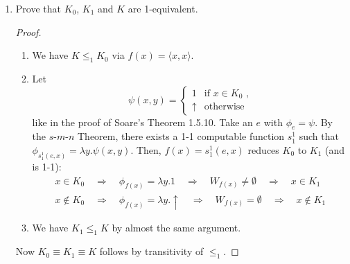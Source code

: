 \documentclass[a4paper,11pt]{article}
\begin{document}
\begin{enumerate}
\item %
Prove that $K_0$, $K_1$ and $K$ are 1-equivalent.

\begin{proof}
\begin{enumerate}
\item We have $K \leq_1 K_0$ via $f(x) = \langle x,x \rangle$.
\item Let
  \begin{equation*}
    \psi(x, y) = \begin{cases}
      1        & \text{if $x \in K_0$ ,}\\
      \uparrow & \text{otherwise}
    \end{cases}
  \end{equation*}
  like in the proof of Soare's Theorem 1.5.10.
  Take an $e$ with $\phi_e = \psi$.
  By the $s$-$m$-$n$ Theorem, there exists a 1-1 computable function $s^1_1$ such that
  $\phi_{s^1_1(e, x)} = \lambda y. \psi(x, y)$. Then, $f(x) = s^1_1(e, x)$ reduces $K_0$
  to $K_1$ (and is 1-1):
  \begin{align*}
    x \in K_0 \quad \Rightarrow \quad \phi_{f(x)} = \lambda y.1 \quad \Rightarrow \quad W_{f(x)} \neq \emptyset \quad \Rightarrow \quad x \in K_1\\
    x \notin K_0 \quad \Rightarrow \quad \phi_{f(x)} = \lambda y.\uparrow \quad \Rightarrow \quad W_{f(x)} = \emptyset \quad \Rightarrow \quad x \notin K_1
  \end{align*}
\item We have $K_1 \leq_1 K$ by almost the same argument.
\end{enumerate}
Now $K_0 \equiv K_1 \equiv K$ follows by transitivity of $\leq_1$.
\end{proof}


\end{enumerate}
\end{document}
